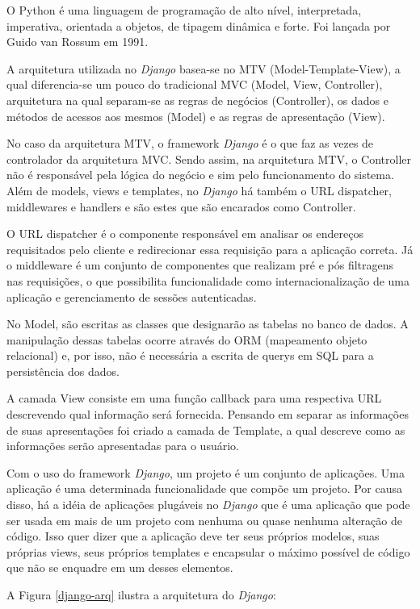 O Python é uma linguagem de programação de alto nível, interpretada, imperativa, orientada a objetos, de tipagem dinâmica e forte. Foi lançada por Guido van Rossum em 1991.

A arquitetura utilizada no \textit{Django} basea-se no MTV (Model-Template-View), a qual diferencia-se um pouco do tradicional MVC (Model, View, Controller), arquitetura na qual separam-se as regras de negócios (Controller), os dados e métodos de acessos aos mesmos (Model) e as regras de apresentação (View).

No caso da arquitetura MTV, o framework \textit{Django} é o que faz as vezes de controlador da arquitetura MVC. Sendo assim, na arquitetura MTV, o Controller não é responsável pela lógica do negócio e sim pelo funcionamento do sistema. Além de models, views e templates, no \textit{Django} há também o URL dispatcher, middlewares e handlers e são estes que são encarados como Controller.

O URL dispatcher é o componente responsável em analisar os endereços requisitados pelo cliente e redirecionar essa requisição para a aplicação correta. Já o middleware é um conjunto de componentes que realizam pré e pós filtragens nas requisições, o que possibilita funcionalidade como internacionalização de uma aplicação e gerenciamento de sessões autenticadas.

No Model, são escritas as classes que designarão as tabelas no banco de dados. A manipulação dessas tabelas ocorre através do ORM (mapeamento objeto relacional) e, por isso, não é necessária a escrita de querys em SQL para a persistência dos dados.

A camada View consiste em uma função callback para uma respectiva URL descrevendo qual informação será fornecida. Pensando em separar as informações de suas apresentações foi criado a camada de Template, a qual descreve como as informações serão apresentadas para o usuário.

Com o uso do framework \textit{Django}, um projeto é um conjunto de aplicações. Uma aplicação é uma determinada funcionalidade que compõe um projeto. Por causa disso, há a idéia de aplicações plugáveis no \textit{Django} que é uma aplicação que pode ser usada em mais de um projeto com nenhuma ou quase nenhuma alteração de código. Isso quer dizer que a aplicação deve ter seus próprios modelos, suas próprias views, seus próprios templates e encapsular o máximo possível de código que não se enquadre em um desses elementos.

A Figura \ref{django-arq} ilustra a arquitetura do \textit{Django}:

